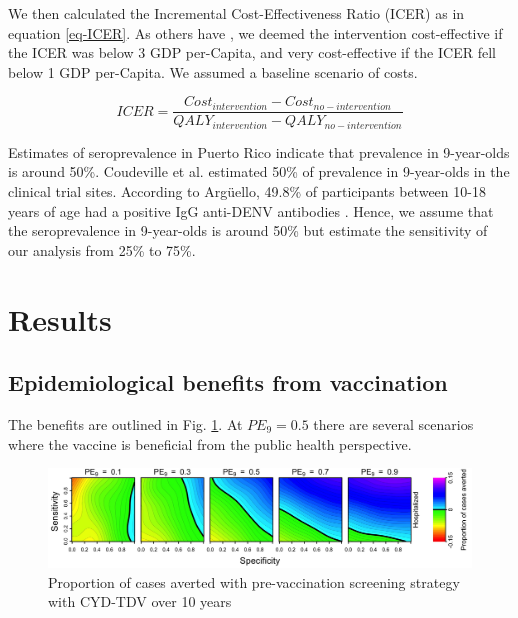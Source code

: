 \documentclass[12pt]{article}
\newcommand{\R}[1]{\label{#1}\linelabel{#1}}
\begin{document}
We then calculated the Incremental Cost-Effectiveness Ratio (ICER) as in equation \ref{eq-ICER}. \R{Rev1Com2} As others have \cite{shim2017,shim2017b,flasche2016}, we deemed the intervention cost-effective if the ICER was below 3 GDP per-Capita, and very cost-effective if the ICER fell below 1 GDP per-Capita. We assumed a baseline scenario of costs. 

\begin{equation}
     ICER = \frac{Cost_{intervention} - Cost_{no-intervention}}
     {QALY_{intervention} - {QALY_{no-intervention}}}
     \label{eq-ICER}
\end{equation}

\R{Rev1Com3-1}Estimates of seroprevalence in Puerto Rico indicate that prevalence in 9-year-olds is around 50\%. Coudeville et al. estimated 50\% of prevalence  in 9-year-olds \cite{Coudeville2016} in the clinical trial sites. According to Argüello, 49.8\% of participants between 10-18 years of age had a positive IgG anti-DENV antibodies \cite{arguello2015AJTMH}. Hence, we assume that the seroprevalence in 9-year-olds is around 50\% but estimate the sensitivity of our analysis from 25\% to 75\%\R{Rev1Com3-2}. 

\section{Results}
\subsection{Epidemiological benefits from vaccination}
The benefits are outlined in Fig. \ref{fig-epi-benefits}. At $PE_9 = 0.5$ there are several scenarios where the vaccine is beneficial from the public health perspective. 

\begin{figure}[htbp]
  \centering
  \includegraphics[width=.9\linewidth]{../analysis/figures/report_figure_cases_averted_heatmap_10y.jpeg}
  \caption{\label{fig-epi-benefits}Proportion of cases averted with pre-vaccination screening strategy with CYD-TDV over 10 years}  
\end{figure}
\end{document}
